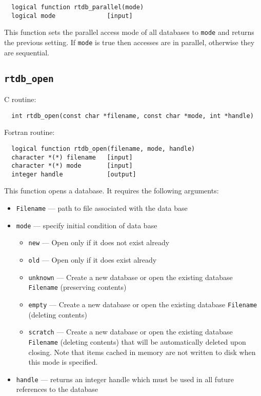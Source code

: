 \begin{verbatim}
  logical function rtdb_parallel(mode)
  logical mode              [input]
\end{verbatim}
This function sets the parallel access mode of all databases to {\tt mode} and returns the
previous setting. If {\tt mode} is true then accesses are in parallel, otherwise they are
sequential.

\subsection{{\tt rtdb\_open}}

C routine:

\begin{verbatim}
  int rtdb_open(const char *filename, const char *mode, int *handle)
\end{verbatim}


Fortran routine:

\begin{verbatim}
  logical function rtdb_open(filename, mode, handle)
  character *(*) filename   [input]
  character *(*) mode       [input]
  integer handle            [output]
\end{verbatim}
This function opens a database.  It requires the following arguments:
\begin{itemize}
\item    {\tt Filename} --- path to file associated with the data base
\item    {\tt mode} --- specify initial condition of data base
\begin{itemize}
\item {\tt new} ---  Open only if it does not exist already
\item {\tt old} ---  Open only if it does exist already
\item {\tt unknown} --- Create a new database or open the existing database {\tt Filename} (preserving contents)
\item {\tt empty} --- Create a new database or open the existing database {\tt Filename} (deleting contents)
\item {\tt scratch} --- Create a new database or open the existing database {\tt Filename} (deleting contents)
                         that will be automatically deleted upon closing.  Note that items
                         cached in memory are not written to disk when this mode is specified.
\end{itemize}
\item {\tt handle} --- returns an integer handle which must be used in all future
  references to the database
\end{itemize}

